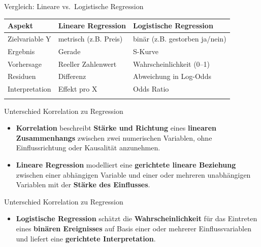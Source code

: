 \documentclass[
  ignorenonframetext,
]{beamer}
\newcounter{none} %
\providecommand{\tightlist}{%
  \setlength{\itemsep}{0pt}\setlength{\parskip}{0pt}}
\begin{document}
\begin{frame}{Vergleich: Lineare vs.~Logistische Regression}
\protect{}\label{vergleich-lineare-vs.-logistische-regression}
{\def\LTcaptype{none} %
\begin{longtable}[]{@{}
  >{\raggedright\arraybackslash}p{}
  >{\raggedright\arraybackslash}p{}
  >{\raggedright\arraybackslash}p{}@{}}
\toprule\noalign{}
\begin{minipage}[b]{\linewidth}\raggedright
Aspekt
\end{minipage} & \begin{minipage}[b]{\linewidth}\raggedright
Lineare Regression
\end{minipage} & \begin{minipage}[b]{\linewidth}\raggedright
Logistische Regression
\end{minipage} \\
\midrule\noalign{}
\endhead
Zielvariable Y & metrisch (z.B. Preis) & binär (z.B. gestorben
ja/nein) \\
Ergebnis & Gerade & S-Kurve \\
Vorhersage & Reeller Zahlenwert & Wahrscheinlichkeit (0--1) \\
Residuen & Differenz & Abweichung in Log-Odds \\
Interpretation & Effekt pro X & Odds Ratio \\
\bottomrule\noalign{}
\end{longtable}
}
\end{frame}

\begin{frame}{Unterschied Korrelation zu Regression}
\protect{}\label{unterschied-korrelation-zu-regression}
\begin{itemize}
\item
  \textbf{Korrelation} beschreibt \textbf{Stärke und Richtung} eines
  \textbf{linearen Zusammenhangs} zwischen zwei numerischen Variablen,
  ohne Einflussrichtung oder Kausalität anzunehmen.
\item
  \textbf{Lineare Regression} modelliert eine \textbf{gerichtete lineare
  Beziehung} zwischen einer abhängigen Variable und einer oder mehreren
  unabhängigen Variablen mit der \textbf{Stärke des Einflusses}.
\end{itemize}
\end{frame}

\begin{frame}{Unterschied Korrelation zu Regression}
\protect{}\label{unterschied-korrelation-zu-regression-1}
\begin{itemize}
\tightlist
\item
  \textbf{Logistische Regression} schätzt die
  \textbf{Wahrscheinlichkeit} für das Eintreten eines \textbf{binären
  Ereignisses} auf Basis einer oder mehrerer Einflussvariablen und
  liefert eine \textbf{gerichtete Interpretation}.
\end{itemize}
\end{frame}
\end{document}
